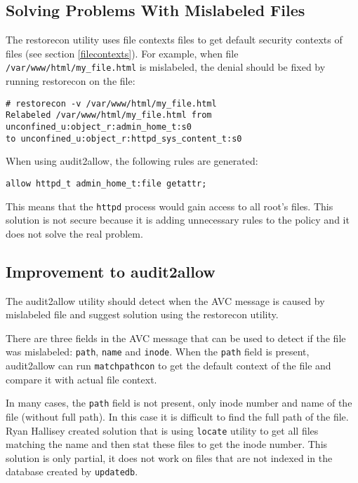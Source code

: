 \subsection{Solving Problems With Mislabeled Files}
The restorecon utility uses file contexts files to get default security contexts
of files (see section \ref{filecontexts}). For example, when file
\texttt{/var/www/html/my\_file.html} is mislabeled, the denial should be fixed
by running restorecon on the file:
\begin{lstlisting}
# restorecon -v /var/www/html/my_file.html
Relabeled /var/www/html/my_file.html from unconfined_u:object_r:admin_home_t:s0
to unconfined_u:object_r:httpd_sys_content_t:s0
\end{lstlisting}

When using audit2allow, the following rules are generated:
\begin{lstlisting}
allow httpd_t admin_home_t:file getattr;
\end{lstlisting}
This means that the \texttt{httpd} process would gain access to all root's
files. This solution is not secure because it is adding unnecessary rules to the
policy and it does not solve the real problem.

\subsection{Improvement to audit2allow}
The audit2allow utility should detect when the AVC message is caused by
mislabeled file and suggest solution using the restorecon utility.

There are three fields in the AVC message that can be used to detect if the file
was mislabeled: \texttt{path}, \texttt{name} and \texttt{inode}. When the
\texttt{path} field is present, audit2allow can run \texttt{matchpathcon} to get
the default context of the file and compare it with actual file context.

In many cases, the \texttt{path} field is not present, only inode number and
name of the file (without full path). In this case it is difficult to find the
full path of the file. Ryan Hallisey created solution \cite{restoreconpullreq}
that is using \texttt{locate} utility to get all files matching the name and
then stat these files to get the inode number. This solution is only partial, it
does not work on files that are not indexed in the database created by
\texttt{updatedb}.

